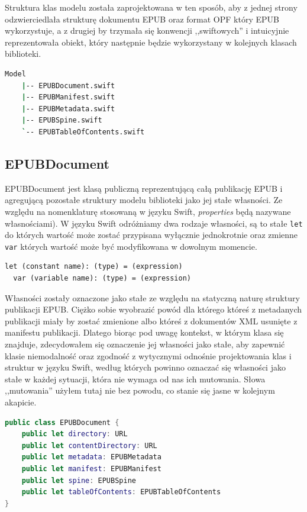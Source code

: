 Struktura klas modelu została zaprojektowana w ten sposób, aby z jednej strony odzwierciedlała strukturę dokumentu EPUB oraz format OPF który EPUB wykorzystuje, a z drugiej by trzymała się konwencji ,,swiftowych'' i intuicyjnie reprezentowała obiekt, który następnie będzie wykorzystany w kolejnych klasach biblioteki.

\begin{lstlisting}[caption={Struktura modelu EPUBKit}, language=bash,label=bbbb]
    Model
    |-- EPUBDocument.swift
    |-- EPUBManifest.swift
    |-- EPUBMetadata.swift
    |-- EPUBSpine.swift
    `-- EPUBTableOfContents.swift
\end{lstlisting}

\subsection{EPUBDocument}
\label{EPUBDocument}

EPUBDocument jest klasą publiczną reprezentującą całą publikację EPUB i agregującą pozostałe struktury modelu biblioteki jako jej stałe własności. Ze względu na nomenklaturę stosowaną w języku Swift, \textit{properties} będą nazywane własnościami). W języku Swift odróżniamy dwa rodzaje własności, są to stałe \texttt{let} do których wartość może zostać przypisana wyłącznie jednokrotnie oraz zmienne \texttt{var} których wartość może być modyfikowana w dowolnym momencie.

\begin{lstlisting}[caption={Deklaracje własności w Swifcie.\cite{theSwiftProgrammingLanguageDeclarations}}, language=swift-reference,label=ppp]
  let (constant name): (type) = (expression)
  var (variable name): (type) = (expression)
\end{lstlisting}

Własności zostały oznaczone jako stałe ze względu na statyczną naturę struktury publikacji EPUB. Ciężko sobie wyobrazić powód dla którego któreś z metadanych publikacji miały by zostać zmienione albo któreś z dokumentów XML usunięte z manifestu publikacji. Dlatego biorąc pod uwagę kontekst, w którym klasa się znajduje, zdecydowałem się oznaczenie jej własności jako stałe, aby zapewnić klasie niemodalność oraz zgodność z wytycznymi odnośnie projektowania klas i struktur w języku Swift, według których powinno oznaczać się własności jako stałe w każdej sytuacji, która nie wymaga od nas ich mutowania. Słowa ,,mutowania'' użyłem tutaj nie bez powodu, co stanie się jasne w kolejnym akapicie.

\begin{lstlisting}[caption={Klasa EPUBDocument i jej stałe publiczne}, language=swift,label=eeeee]
public class EPUBDocument {
    public let directory: URL
    public let contentDirectory: URL
    public let metadata: EPUBMetadata
    public let manifest: EPUBManifest
    public let spine: EPUBSpine
    public let tableOfContents: EPUBTableOfContents
}
\end{lstlisting}

